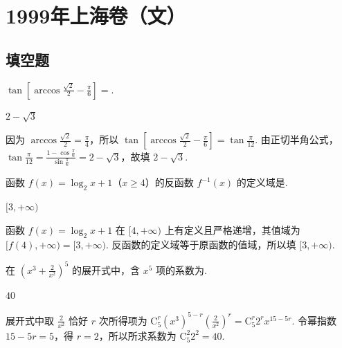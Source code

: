 \documentclass[UTF8,a4paper,oneside,11pt]{ctexbook}
\begin{document}
\mainmatter

\chapter{1999年上海卷（文）}
\section{填空题}

\begin{problem}
\(\tan\left[\arccos\frac{\sqrt{2}}{2}-\frac{\pi}{6}\right]=\)\fillinblank{}.
\end{problem}

\begin{answer}
\(2-\sqrt{3}\)
\end{answer}

\begin{solution}
因为 \(\arccos\frac{\sqrt{2}}{2}=\frac{\pi}{4}\)，所以
\(\tan\left[\arccos\frac{\sqrt{2}}{2}-\frac{\pi}{6}\right]=\tan\frac{\pi}{12}\). 由正切半角公式，\(\tan\frac{\pi}{12}=\frac{1-\cos\frac{\pi}{6}}{\sin\frac{\pi}{6}}=2-\sqrt{3}\)，故填 \(2-\sqrt{3}\).
\end{solution}

\begin{problem}
函数 \(f(x)=\log_{2}x+1\)（\(x\geqslant4\)）的反函数 \(f^{-1}(x) \) 的定义域是\fillinblank{}.
\end{problem}

\begin{answer}
\([3,+\infty)\)
\end{answer}

\begin{solution}
函数 \(f(x)=\log_{2}x+1\) 在 \([4,+\infty)\) 上有定义且严格递增，其值域为 \([f(4),+\infty)=[3,+\infty)\). 反函数的定义域等于原函数的值域，所以填 \([3,+\infty)\).
\end{solution}

\begin{problem}
在 \((x^{3}+\frac{2}{x^{2}})^{5} \) 的展开式中，含 \(x^{5} \) 项的系数为\fillinblank{}.
\end{problem}

\begin{answer}
\(40\)
\end{answer}

\begin{solution}
展开式中取 \(\frac{2}{x^{2}}\) 恰好 \(r\) 次所得项为
\(\mathrm C_{5}^{r}(x^{3})^{5-r}\left(\frac{2}{x^{2}}\right)^{r}=\mathrm C_{5}^{r}2^{r}x^{15-5r}\). 令幂指数 \(15-5r=5\)，得 \(r=2\)，所以所求系数为 \(\mathrm C_{5}^{2}2^{2}=40\).
\end{solution}
\end{document}
